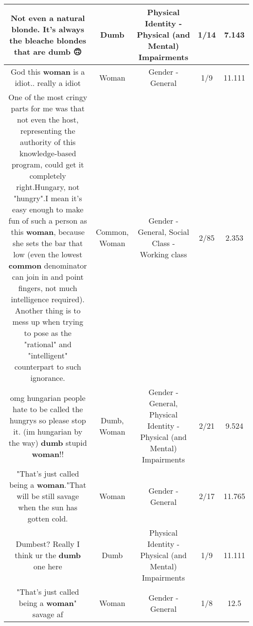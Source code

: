 \documentclass[11pt]{article}
\newlength\mylength
\begin{document}
\begin{center}
\begin{longtable}{|C{.65\mylength}|C{.30\mylength}|C{.12\mylength}|C{.12\mylength}|C{.12\mylength}|}
  \small Not even a natural blonde. It's always the bleache blondes that are \textbf{dumb} 🙃\normalsize   & Dumb & Physical Identity - Physical (and Mental) Impairments & 1/14 & 7.143 \\  \hline
  \small God this \textbf{woman} is a idiot.. really a idiot\normalsize   & Woman & Gender - General & 1/9 & 11.111 \\  \hline
  \small One of the most cringy parts for me was that not even the host, representing the authority of this knowledge-based program, could get it completely right.Hungary, not "hungry".I mean it's easy enough to make fun of such a person as this \textbf{woman}, because she sets the bar that low (even the lowest \textbf{common} denominator can join in and point fingers, not much intelligence required). Another thing is to mess up when trying to pose as the "rational" and "intelligent" counterpart to such ignorance.\normalsize   & Common, Woman & Gender - General, Social Class - Working class & 2/85 & 2.353 \\  \hline
  \small omg hungarian people hate to be called the hungrys so please stop it. (im hungarian by the way) \textbf{dumb} stupid \textbf{woman}!!\normalsize   & Dumb, Woman & Gender - General, Physical Identity - Physical (and Mental) Impairments & 2/21 & 9.524 \\  \hline
  \small "That's just called being a \textbf{woman}."That will be still savage when the sun has gotten cold.\normalsize   & Woman & Gender - General & 2/17 & 11.765 \\  \hline
  \small Dumbest? Really I think ur the \textbf{dumb} one here\normalsize   & Dumb & Physical Identity - Physical (and Mental) Impairments & 1/9 & 11.111 \\  \hline
  \small "That's just called being a \textbf{woman}" savage af\normalsize   & Woman & Gender - General & 1/8 & 12.5 \\  \hline

\end{longtable}
\end{center}
\end{document}
